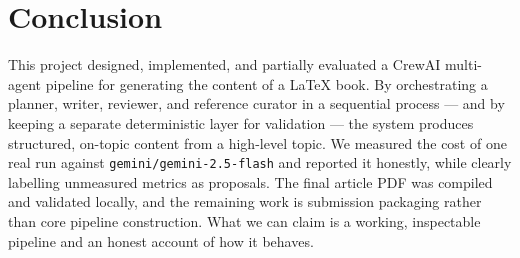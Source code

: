 
\chapter{Conclusion}

This project designed, implemented, and partially evaluated a CrewAI
multi-agent pipeline for generating the content of a \LaTeX{} book. By
orchestrating a planner, writer, reviewer, and reference curator in a
sequential process --- and by keeping a separate deterministic layer for
validation --- the system produces structured, on-topic content from a
high-level topic. We measured the cost of one real run against
\texttt{gemini/gemini-2.5-flash} and reported it honestly, while clearly
labelling unmeasured metrics as proposals. The final article PDF was compiled
and validated locally, and the remaining work is submission packaging rather
than core pipeline construction. What we can claim is a working, inspectable
pipeline and an honest account of how it behaves.
